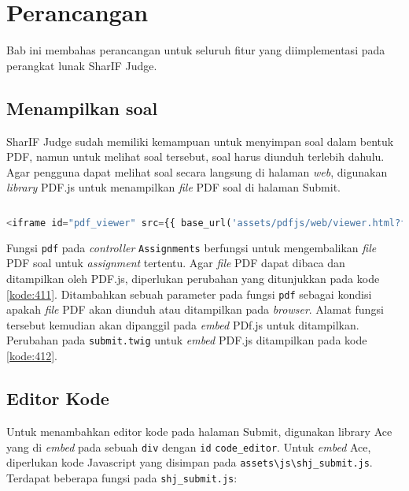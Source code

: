 \chapter{Perancangan}
\label{chap:perancangan}

Bab ini membahas perancangan untuk seluruh fitur yang diimplementasi pada  perangkat lunak SharIF Judge.

\section{Menampilkan soal}
\label{sec:4:soal}

SharIF Judge sudah memiliki kemampuan untuk menyimpan soal dalam bentuk PDF, namun untuk melihat soal tersebut, soal harus diunduh terlebih dahulu. Agar pengguna dapat melihat soal secara langsung di halaman \textit{web}, digunakan \textit{library} PDF.js untuk menampilkan \textit{file} PDF soal di halaman Submit.

\begin{lstlisting}[language=php, caption=Perubahan pada \texttt{Assignments.php}, label=kode:411]


\end{lstlisting}

\begin{lstlisting}[language=php, caption=Perubahan pada \texttt{submit.twig}, label=kode:412]
	<iframe id="pdf_viewer" src={{ base_url('assets/pdfjs/web/viewer.html?file=') ~ site_url('assignments/pdf/' ~ user.selected_assignment.id ~ '/null/true')}} ></iframe>
\end{lstlisting}

Fungsi \verb|pdf| pada \textit{controller} \verb|Assignments| berfungsi untuk mengembalikan \textit{file} PDF soal untuk \textit{assignment} tertentu. Agar \textit{file} PDF dapat dibaca dan ditampilkan oleh PDF.js, diperlukan perubahan yang ditunjukkan pada kode \ref{kode:411}. Ditambahkan sebuah parameter pada fungsi \verb|pdf| sebagai kondisi apakah \textit{file} PDF akan diunduh atau ditampilkan pada \textit{browser}. Alamat fungsi tersebut kemudian akan dipanggil pada \textit{embed} PDf.js untuk ditampilkan. Perubahan pada \verb|submit.twig| untuk \textit{embed} PDF.js ditampilkan pada kode \ref{kode:412}.

\section{Editor Kode}
\label{sec:4:editor}

Untuk menambahkan editor kode pada halaman Submit, digunakan library Ace yang di \textit{embed} pada sebuah \verb|div| dengan \verb|id| \verb|code_editor|. Untuk \textit{embed} Ace, diperlukan kode Javascript yang disimpan pada \verb|assets\js\shj_submit.js|. Terdapat beberapa fungsi pada \verb|shj_submit.js|:

